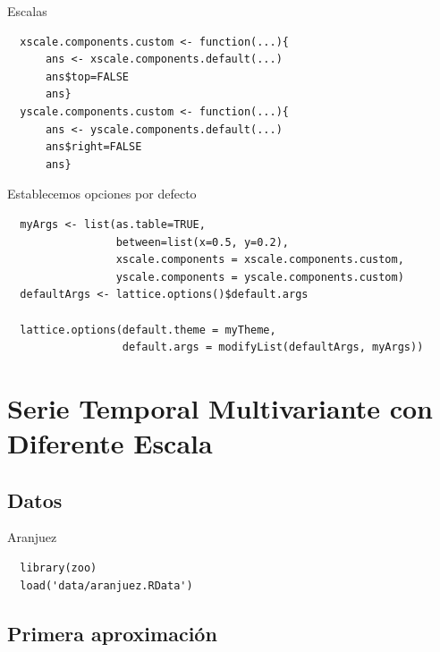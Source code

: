 \documentclass[xcolor={usenames,svgnames,dvipsnames}]{beamer}
\begin{document}
\begin{frame}[fragile,label=sec-1-2-3]{Escalas}
 \lstset{language=R,label= ,caption= ,numbers=none}
\begin{lstlisting}
  xscale.components.custom <- function(...){
      ans <- xscale.components.default(...)
      ans$top=FALSE
      ans}
  yscale.components.custom <- function(...){
      ans <- yscale.components.default(...)
      ans$right=FALSE
      ans}
\end{lstlisting}
\end{frame}

\begin{frame}[fragile,label=sec-1-2-4]{Establecemos opciones por defecto}
 \lstset{language=R,label= ,caption= ,numbers=none}
\begin{lstlisting}
  myArgs <- list(as.table=TRUE,
                 between=list(x=0.5, y=0.2),
                 xscale.components = xscale.components.custom,
                 yscale.components = yscale.components.custom)
  defaultArgs <- lattice.options()$default.args
  
  lattice.options(default.theme = myTheme,
                  default.args = modifyList(defaultArgs, myArgs))
\end{lstlisting}
\end{frame}


\section{Serie Temporal Multivariante con Diferente Escala}
\label{sec-2}

\subsection{Datos}
\label{sec-2-1}

\begin{frame}[fragile,label=sec-2-1-1]{Aranjuez}
 \lstset{language=R,label= ,caption= ,numbers=none}
\begin{lstlisting}
  library(zoo)
  load('data/aranjuez.RData')
\end{lstlisting}
\end{frame}

\subsection{Primera aproximación}
\label{sec-2-2}
\end{document}
